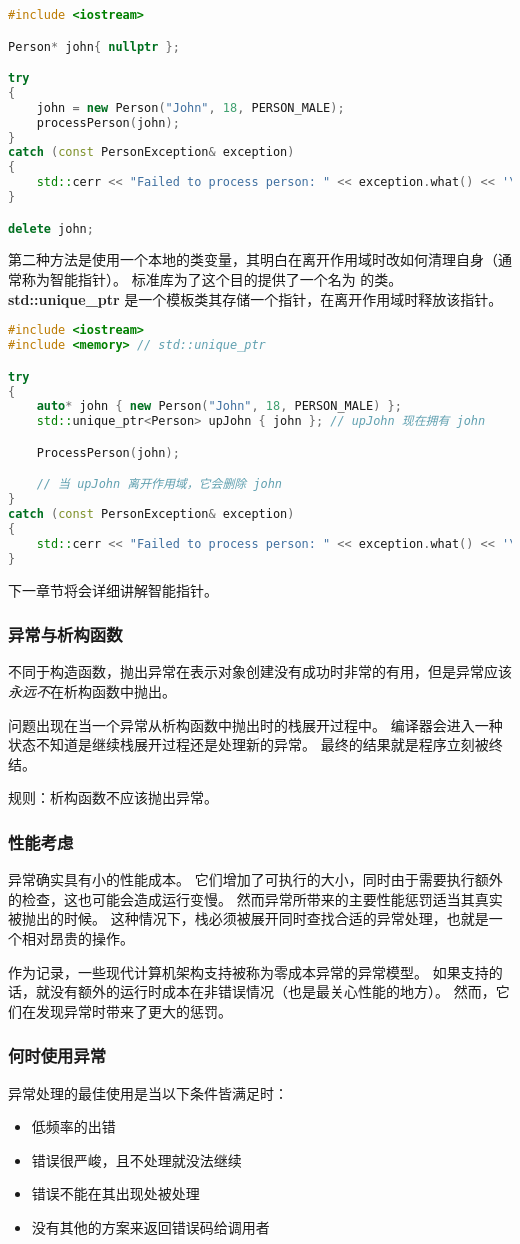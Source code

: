 \documentclass[../../LearnCpp.tex]{subfiles}
\begin{document}
\begin{lstlisting}[language=C++]
#include <iostream>

Person* john{ nullptr };

try
{
    john = new Person("John", 18, PERSON_MALE);
    processPerson(john);
}
catch (const PersonException& exception)
{
    std::cerr << "Failed to process person: " << exception.what() << '\n';
}

delete john;
\end{lstlisting}

第二种方法是使用一个本地的类变量，其明白在离开作用域时改如何清理自身（通常称为智能指针）。
标准库为了这个目的提供了一个名为  的类。
\textbf{std::unique\_ptr} 是一个模板类其存储一个指针，在离开作用域时释放该指针。

\begin{lstlisting}[language=C++]
#include <iostream>
#include <memory> // std::unique_ptr

try
{
    auto* john { new Person("John", 18, PERSON_MALE) };
    std::unique_ptr<Person> upJohn { john }; // upJohn 现在拥有 john

    ProcessPerson(john);

    // 当 upJohn 离开作用域，它会删除 john
}
catch (const PersonException& exception)
{
    std::cerr << "Failed to process person: " << exception.what() << '\n';
}
\end{lstlisting}

下一章节将会详细讲解智能指针。

\subsubsection*{异常与析构函数}

不同于构造函数，抛出异常在表示对象创建没有成功时非常的有用，但是异常应该\textit{永远不}在析构函数中抛出。

问题出现在当一个异常从析构函数中抛出时的栈展开过程中。
编译器会进入一种状态不知道是继续栈展开过程还是处理新的异常。
最终的结果就是程序立刻被终结。

规则：析构函数不应该抛出异常。

\subsubsection*{性能考虑}

异常确实具有小的性能成本。
它们增加了可执行的大小，同时由于需要执行额外的检查，这也可能会造成运行变慢。
然而异常所带来的主要性能惩罚适当其真实被抛出的时候。
这种情况下，栈必须被展开同时查找合适的异常处理，也就是一个相对昂贵的操作。

作为记录，一些现代计算机架构支持被称为零成本异常的异常模型。
如果支持的话，就没有额外的运行时成本在非错误情况（也是最关心性能的地方）。
然而，它们在发现异常时带来了更大的惩罚。

\subsubsection*{何时使用异常}

异常处理的最佳使用是当以下条件皆满足时：

\begin{itemize}
    \item 低频率的出错
    \item 错误很严峻，且不处理就没法继续
    \item 错误不能在其出现处被处理
    \item 没有其他的方案来返回错误码给调用者
\end{itemize}
\end{document}
